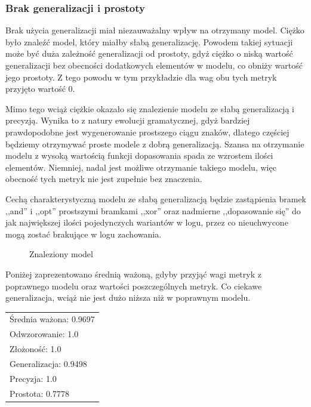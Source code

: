 \subsubsection{Brak generalizacji i prostoty}
Brak użycia generalizacji miał niezauważalny wpływ na otrzymany model. Ciężko było znaleźć model, który miałby słabą generalizację. Powodem takiej sytuacji może być duża zależność generalizacji od prostoty, gdyż ciężko o niską wartość generalizacji bez obecności dodatkowych elementów w modelu, co obniży wartość jego prostoty. Z tego powodu w tym przykładzie dla wag obu tych metryk przyjęto wartość 0.

Mimo tego wciąż ciężkie okazało się znalezienie modelu ze słabą generalizacją i precyzją. Wynika to z natury ewolucji gramatycznej, gdyż bardziej prawdopodobne jest wygenerowanie prostszego ciągu znaków, dlatego częściej będziemy otrzymywać proste modele z dobrą generalizacją. Szansa na otrzymanie modelu z wysoką wartością funkcji dopasowania spada ze wzrostem ilości elementów. Niemniej, nadal jest możliwe otrzymanie takiego modelu, więc obecność tych metryk nie jest zupełnie bez znaczenia.

Cechą charakterystyczną modelu ze słabą generalizacją będzie zastąpienia bramek ,,and'' i ,,opt'' prostszymi bramkami ,,xor'' oraz nadmierne ,,dopasowanie się'' do jak największej ilości pojedynczych wariantów w logu, przez co nieuchwycone mogą zostać brakujące w logu zachowania.

\begin{figure}[H]
	\caption{\label{fig:flow_chart}Znaleziony model}
\end{figure}

Poniżej zaprezentowano średnią ważoną, gdyby przyjąć wagi metryk z poprawnego modelu  oraz wartości poszczególnych metryk. Co ciekawe generalizacja, wciąż nie jest dużo niższa niż w poprawnym modelu.
 
 \begin{center}
  \begin{tabular}{l}
	Średnia ważona: 0.9697 \\
	Odwzorowanie: 1.0 \\
	Złożoność: 1.0 \\
	Generalizacja: 0.9498 \\
	Precyzja: 1.0 \\
	Prostota: 0.7778
  \end{tabular}
 \end{center}

